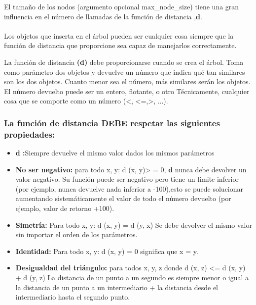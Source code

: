 \documentclass[a4paper]{article}
\begin{document}
El tamaño de los nodos (argumento opcional max\_node\_size) tiene una gran influencia en el número de llamadas de la función de distancia ,\textbf{d}.
\\
\\
Los objetos que inserta en el árbol pueden ser cualquier cosa siempre que la función de distancia que proporcione sea capaz de manejarlos correctamente.

La función de distancia \textbf{(d)} debe proporcionarse cuando se crea el árbol. Toma como parámetro dos objetos y devuelve un número que indica qué tan similares son los dos objetos. Cuanto menor sea el número, más similares serán los objetos. El número devuelto puede ser un entero, flotante, o otro Técnicamente, cualquier cosa que se comporte como un número (<, <=,>, ...).

\subsubsection*{La función de distancia DEBE respetar las siguientes propiedades: }

\begin{itemize}
    \item \textbf{d :}Siempre devuelve el mismo valor dados los mismos parámetros
    
    \item \textbf{No ser negativo:} para todo x, y: d (x, y)> = 0,\textbf{ d} nunca debe devolver un valor negativo.  Su función puede ser negativo pero tiene un límite inferior (por ejemplo, nunca devuelve nada inferior a -100),esto se puede solucionar aumentando sistemáticamente el valor de todo el número devuelto (por ejemplo, valor de retorno +100).
    
    
    \item\textbf{ Simetría:} Para todo x, y: d (x, y) = d (y, x) Se debe devolver el mismo valor sin importar el orden de los parámetros.
    
    
    \item\textbf{ Identidad:} Para todo x, y: d (x, y) = 0 significa que x = y.
    
    \item\textbf{ Desigualdad del triángulo:} para todos x, y, z donde d (x, z) <= d (x, y) + d (y, z) La distancia de un punto a un segundo es siempre menor o igual a la distancia de un punto a un intermediario + la distancia desde el intermediario hasta el segundo punto.
    
    

\end{itemize}
\end{document}
